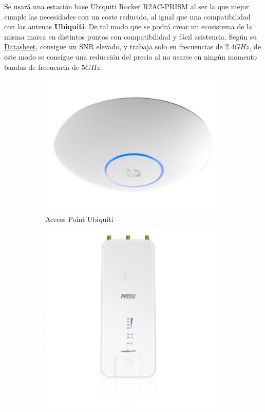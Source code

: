 \documentclass{article}
\begin{document}
\quad

Se usará una estación base Ubiquiti Rocket R2AC-PRISM al ser la que mejor cumple las necesidades con un coste reducido, al igual que una compatibilidad con las antenas \textbf{Ubiquiti}. De tal modo que se podrá crear un ecosistema de la misma marca en distintos puntos con compatibilidad y fácil asistencia. Según su \href{https://dl.ubnt.com/datasheets/RocketAC/Rocket_R2AC_DS.pdf}{Datasheet}, consigue un SNR elevado, y trabaja solo en frecuencias de $2.4GHz$, de este modo se consigue una reducción del precio al no usarse en ningún momento bandas de frecuencia de $5GHz$.

\begin{figure}[ht]
	\centering
	\begin{subfigure}{0.35\textwidth}
		\includegraphics[width=\linewidth]{src/ap.jpg}
		\caption{Access Point Ubiquiti}
		\label{fig:ap}
	\end{subfigure}%
	\begin{subfigure}{0.25\textwidth}
		\includegraphics[width=\linewidth]{src/estacion base.jpeg}

\end{subfigure}
\end{figure}
\end{document}
